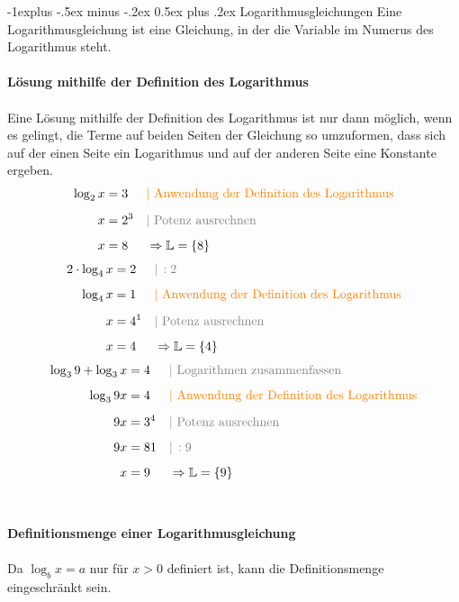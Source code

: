 \documentclass[10pt,landscape]{article}
\makeatletter
\renewcommand{\subsection}{\@startsection{subsection}{2}{0mm}%
                                {-1explus -.5ex minus -.2ex}%
                                {0.5ex plus .2ex}%
                                {\normalfont\normalsize\bfseries}}
\makeatother
\begin{document}
\begin{multicols}{3}
    \subsection{Logarithmus­gleichungen}
    Eine Logarithmusgleichung ist eine Gleichung, in der die Variable im Numerus des Logarithmus steht. \\~\\
    \textbf{Lösung mithilfe der Definition des Logarithmus}\\~\\
    Eine Lösung mithilfe der Definition des Logarithmus ist nur dann möglich, wenn es gelingt, die Terme auf beiden Seiten der Gleichung so umzuformen, dass sich auf der einen Seite ein Logarithmus und auf der anderen Seite eine Konstante ergeben.
    \begin{align*} \log_{2}x &= 3 &&{\color{orange}| \text{ Anwendung der Definition des Logarithmus}} \\[5px] x &= 2^3 &&{\color{gray}| \text{ Potenz ausrechnen}} \\[5px] x &= 8 && \Rightarrow \mathbb{L} = \{8\} \end{align*}
    \begin{align*} 2 \cdot \log_{4}x &= 2 &&{\color{gray}|\, :2} \\[5px] \log_{4}x &= 1 &&{\color{orange}| \text{ Anwendung der Definition des Logarithmus}} \\[5px] x &= 4^1 &&{\color{gray}| \text{ Potenz ausrechnen}} \\[5px] x &= 4 && \Rightarrow \mathbb{L} = \{4\} \end{align*}
    \begin{align*} \log_{3}9 + \log_{3}x &= 4 &&{\color{gray}| \text{ Logarithmen zusammenfassen}} \\[5px] \log_{3}9x &= 4 &&{\color{orange}| \text{ Anwendung der Definition des Logarithmus}} \\[5px] 9x &= 3^4 &&{\color{gray}| \text{ Potenz ausrechnen}} \\[5px] 9x &= 81 &&{\color{gray}|\, :9} \\[5px] x &= 9 && \Rightarrow \mathbb{L} = \{9\} \end{align*}\\~\\
    \textbf{Definitionsmenge einer Logarithmusgleichung }\\~\\
    Da $\log_{b}x = a$  nur für $x > 0$ definiert ist, kann die Definitionsmenge eingeschränkt sein.


\end{multicols}
\end{document}
